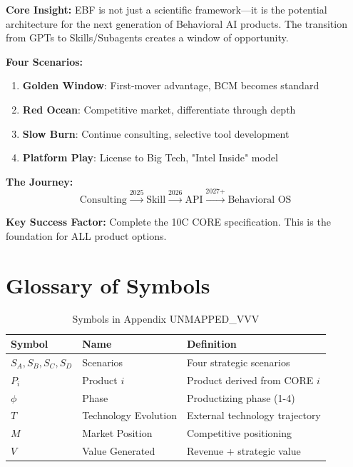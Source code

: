 \begin{tcolorbox}[colback=gray!5!white, colframe=gray!75!black,
    title=Appendix UNMAPPED_VVV Summary: Business Model \& Productizing]

\textbf{Core Insight:}
EBF is not just a scientific framework---it is the potential architecture for the next generation of Behavioral AI products. The transition from GPTs to Skills/Subagents creates a window of opportunity.

\textbf{Four Scenarios:}
\begin{enumerate}[nosep]
\item \textbf{Golden Window}: First-mover advantage, BCM becomes standard
\item \textbf{Red Ocean}: Competitive market, differentiate through depth
\item \textbf{Slow Burn}: Continue consulting, selective tool development
\item \textbf{Platform Play}: License to Big Tech, "Intel Inside" model
\end{enumerate}

\textbf{The Journey:}
\[
\text{Consulting} \xrightarrow{\text{2025}} \text{Skill} \xrightarrow{\text{2026}} \text{API} \xrightarrow{\text{2027+}} \text{Behavioral OS}
\]

\textbf{Key Success Factor:}
Complete the 10C CORE specification. This is the foundation for ALL product options.

\end{tcolorbox}


\section{Glossary of Symbols}
\label{sec:vvv-glossary}

\begin{table}[htbp]
\centering
\caption{Symbols in Appendix UNMAPPED_VVV}
\label{tab:vvv-symbols}
\renewcommand{\arraystretch}{1.3}
\begin{tabular}{@{}lll@{}}
\toprule
\textbf{Symbol} & \textbf{Name} & \textbf{Definition} \\
\midrule
$S_A, S_B, S_C, S_D$ & Scenarios & Four strategic scenarios \\
$P_{i}$ & Product $i$ & Product derived from CORE $i$ \\
$\phi$ & Phase & Productizing phase (1-4) \\
$T$ & Technology Evolution & External technology trajectory \\
$M$ & Market Position & Competitive positioning \\
$V$ & Value Generated & Revenue + strategic value \\
\bottomrule
\end{tabular}
\end{table}


